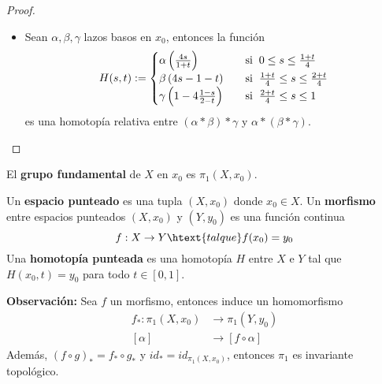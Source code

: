 \documentclass{article}
\begin{document}
\begin{proof}
\begin{itemize}
        \item Sean $\alpha,\beta,\gamma$ lazos basos en $x_{0}$, entonces la función
        \begin{equation*}
            H(s,t):=\begin{cases}
                \alpha\left(\frac{4s}{1+t}\right) 
                &\quad\text{si}\hspace{2mm}0\leq s\leq\frac{1+t}{4} \\
                \beta\left(4s-1-t\right) 
                &\quad\text{si}\hspace{2mm}\frac{1+t}{4}\leq s\leq\frac{2+t}{4} \\
                \gamma\left(1-4\frac{1-s}{2-t}\right) 
                &\quad\text{si}\hspace{2mm}\frac{2+t}{4}\leq s\leq1
            \end{cases}
        \end{equation*}
        es una homotopía relativa entre $(\alpha*\beta)*\gamma$ y $\alpha*(\beta*\gamma)$.
    \end{itemize}
\end{proof}

\begin{dfn}
    El \textbf{grupo fundamental} de $X$ en $x_{0}$ es $\pi_{1}(X,x_{0})$.
\end{dfn}

\vspace{2mm}
\begin{dfn}
    Un \textbf{espacio punteado} es una tupla $(X,x_{0})$ donde $x_{0}\in X$. Un \textbf{morfismo} 
    entre espacios punteados $(X,x_{0})$ y $(Y,y_{0})$ es una función continua
    \begin{equation*}
        f:X\to Y\htext{tal que}f(x_{0})=y_{0}
    \end{equation*}
    Una \textbf{homotopía punteada} es una homotopía $H$ entre $X$ e $Y$ tal que 
    $H(x_{0},t)=y_{0}$ para todo $t\in[0,1]$.
\end{dfn}

\vspace{2mm}
\noindent\textbf{Observación:} Sea $f$ un morfismo, entonces induce un homomorfismo
\begin{align*}
    f_{*}:\pi_{1}(X,x_{0}) &\to \pi_{1}(Y,y_{0}) \\
    [\alpha] &\to [f\circ\alpha]
\end{align*}
Además, $(f\circ g)_{*}=f_{*}\circ g_{*}$ y $id_{*}=id_{\pi_{1}(X,x_{0})}$, entonces $\pi_{1}$ es
invariante topológico.

\end{document}
